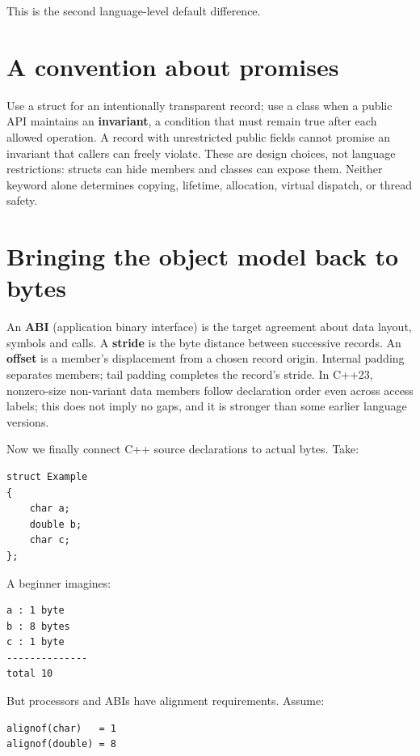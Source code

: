 This is the second language-level default difference.

\section{A convention about promises}\label{01-foundations-i-ch003-a-convention-about-promises}

Use a struct for an intentionally transparent record; use a class when a public API maintains an \textbf{invariant}, a condition that must remain true after each allowed operation. A record with unrestricted public fields cannot promise an invariant that callers can freely violate. These are design choices, not language restrictions: structs can hide members and classes can expose them. Neither keyword alone determines copying, lifetime, allocation, virtual dispatch, or thread safety.

\section{Bringing the object model back to bytes}\label{01-foundations-i-ch003-bringing-the-object-model-back-to-bytes}

An \textbf{ABI} (application binary interface) is the target agreement about data layout, symbols and calls. A \textbf{stride} is the byte distance between successive records. An \textbf{offset} is a member's displacement from a chosen record origin. Internal padding separates members; tail padding completes the record's stride. In C++23, nonzero-size non-variant data members follow declaration order even across access labels; this does not imply no gaps, and it is stronger than some earlier language versions.

Now we finally connect C++ source declarations to actual bytes. Take:

\begin{verbatim}
struct Example
{
    char a;
    double b;
    char c;
};
\end{verbatim}

A beginner imagines:

\begin{verbatim}
a : 1 byte
b : 8 bytes
c : 1 byte
--------------
total 10
\end{verbatim}

But processors and ABIs have alignment requirements. Assume:

\begin{verbatim}
alignof(char)   = 1
alignof(double) = 8
\end{verbatim}

